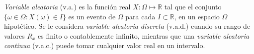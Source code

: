 



\emph{Variable aleatoria} (v.a.) es la función real $X: \Omega\mapsto\mathbb{R}$ tal que el conjunto $\{\omega\in\Omega:X(\omega)\in I\}$ es un evento de $\Omega$ para cada $I\subset\mathbb{R}$, en un espacio $\Omega$ hipotético. Se le considera \emph{variable aleatoria discreta} (v.a.d.) cuando su rango de valores $R_x$ es finito o contablemente infinito, mientras que una \emph{variable aleatoria continua} (v.a.c.) puede tomar cualquier valor real en un intervalo.



